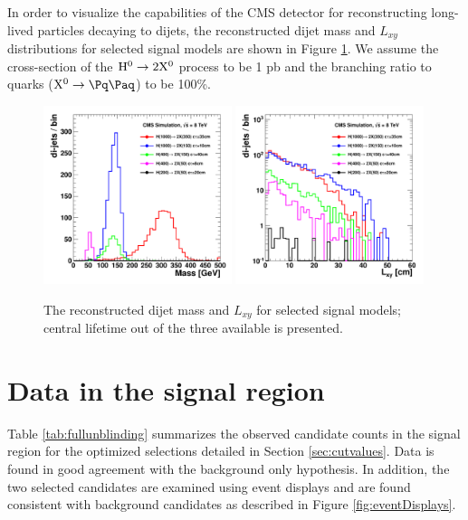 In order to visualize the capabilities of the CMS detector for reconstructing long-lived particles decaying to 
dijets, 
the reconstructed dijet mass and $L_{xy}$ distributions for selected signal models are shown in Figure
\ref{fig:signal}. We assume the cross-section of the $\mathrm{H}^{0} \to 2\mathrm{X^{0}}$ process to be 1 pb and the branching 
ratio to quarks ($\X \to \qq$) to be 100\%.

\begin{figure}[htbp]
\centering
\includegraphics[width=0.49\textwidth]{plots/signal/mass.pdf}
\includegraphics[width=0.49\textwidth]{plots/signal/Lxy.pdf}
\caption{The reconstructed dijet mass and $L_{xy}$ for selected signal models; central lifetime out of the three available is presented.\label{fig:signal}}
\end{figure}

\section{Data in the signal region}
\label{sec:fullunblinding}

Table \ref{tab:fullunblinding} summarizes the observed candidate counts in the signal region for the optimized 
selections detailed in Section \ref{sec:cutvalues}. Data is found in good agreement with the 
background only hypothesis. In addition, the two selected candidates are examined using event displays
and are found consistent with background candidates as described in Figure \ref{fig:eventDisplays}.  

